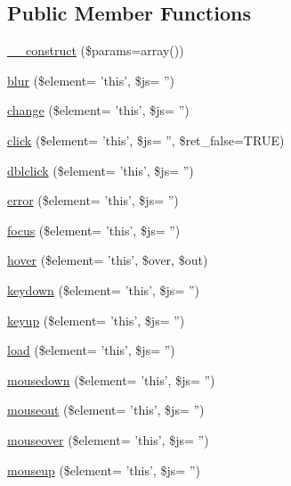 \subsection*{Public Member Functions}
\begin{DoxyCompactItemize}
\item 
\hyperlink{class_c_i___javascript_a568ecdb0d73d2a870f33189739922a50}{\-\_\-\-\_\-construct} (\$params=array())
\item 
\hyperlink{class_c_i___javascript_a6125f6eca076179902d891ede8aaa79c}{blur} (\$element= 'this', \$js= '')
\item 
\hyperlink{class_c_i___javascript_aa091633b134b81e4caf9d0eee0bf3299}{change} (\$element= 'this', \$js= '')
\item 
\hyperlink{class_c_i___javascript_a6048b9a0f28be2dc60498a7284aba2af}{click} (\$element= 'this', \$js= '', \$ret\-\_\-false=T\-R\-U\-E)
\item 
\hyperlink{class_c_i___javascript_a83698e9e3b9996852589c39b5eb136af}{dblclick} (\$element= 'this', \$js= '')
\item 
\hyperlink{class_c_i___javascript_a1c84a9a14d971e03d13f5c4e10e6c79a}{error} (\$element= 'this', \$js= '')
\item 
\hyperlink{class_c_i___javascript_a84f8cd6221f58c5ad22bf5408f259b81}{focus} (\$element= 'this', \$js= '')
\item 
\hyperlink{class_c_i___javascript_ab699260782310abba39faf37c2866c48}{hover} (\$element= 'this', \$over, \$out)
\item 
\hyperlink{class_c_i___javascript_ae1b580396f9e7b3eb3018946e37b64a3}{keydown} (\$element= 'this', \$js= '')
\item 
\hyperlink{class_c_i___javascript_a96655359803d164f26ead21db2980f32}{keyup} (\$element= 'this', \$js= '')
\item 
\hyperlink{class_c_i___javascript_a27f32c982522ffd8d4224131757903b8}{load} (\$element= 'this', \$js= '')
\item 
\hyperlink{class_c_i___javascript_aa9e323abc6f90ab1db1aad2d7eb14634}{mousedown} (\$element= 'this', \$js= '')
\item 
\hyperlink{class_c_i___javascript_a2ad52a2253eef38cf959f3d102747e43}{mouseout} (\$element= 'this', \$js= '')
\item 
\hyperlink{class_c_i___javascript_a9bd9c5ff9af4f84698298d1b5c7d24d7}{mouseover} (\$element= 'this', \$js= '')
\item 
\hyperlink{class_c_i___javascript_aacc570d2bf7bb4aff0201ca8cdeb6944}{mouseup} (\$element= 'this', \$js= '')

\end{DoxyCompactItemize}
